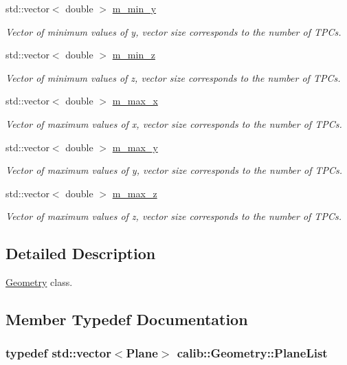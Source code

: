 \begin{DoxyCompactItemize}
std\-::vector$<$ double $>$ \hyperlink{classcalib_1_1Geometry_adb4cc41aa504cbff34d567ad117fa834}{m\-\_\-min\-\_\-y}
\begin{DoxyCompactList}\small\item\em Vector of minimum values of y, vector size corresponds to the number of T\-P\-Cs. \end{DoxyCompactList}\item 
std\-::vector$<$ double $>$ \hyperlink{classcalib_1_1Geometry_ac81ad69998b30f5e38e5702823cdee59}{m\-\_\-min\-\_\-z}
\begin{DoxyCompactList}\small\item\em Vector of minimum values of z, vector size corresponds to the number of T\-P\-Cs. \end{DoxyCompactList}\item 
std\-::vector$<$ double $>$ \hyperlink{classcalib_1_1Geometry_a76078aab02f168c6d57aab439bc959c0}{m\-\_\-max\-\_\-x}
\begin{DoxyCompactList}\small\item\em Vector of maximum values of x, vector size corresponds to the number of T\-P\-Cs. \end{DoxyCompactList}\item 
std\-::vector$<$ double $>$ \hyperlink{classcalib_1_1Geometry_ab5a15bf7344647c780bd212b2d0adf24}{m\-\_\-max\-\_\-y}
\begin{DoxyCompactList}\small\item\em Vector of maximum values of y, vector size corresponds to the number of T\-P\-Cs. \end{DoxyCompactList}\item 
std\-::vector$<$ double $>$ \hyperlink{classcalib_1_1Geometry_a107c432e83c78151866ad2c0a3da246e}{m\-\_\-max\-\_\-z}
\begin{DoxyCompactList}\small\item\em Vector of maximum values of z, vector size corresponds to the number of T\-P\-Cs. \end{DoxyCompactList}\end{DoxyCompactItemize}


\subsection{Detailed Description}
\hyperlink{classcalib_1_1Geometry}{Geometry} class. 

\subsection{Member Typedef Documentation}
\hypertarget{classcalib_1_1Geometry_a85d1d4140e153e7d0e423208954107aa}{
\subsubsection[{Plane\-List}]{\setlength{\rightskip}{0pt plus 5cm}typedef std\-::vector$<${\bf Plane}$>$ {\bf calib\-::\-Geometry\-::\-Plane\-List}}}\label{classcalib_1_1Geometry_a85d1d4140e153e7d0e423208954107aa}



